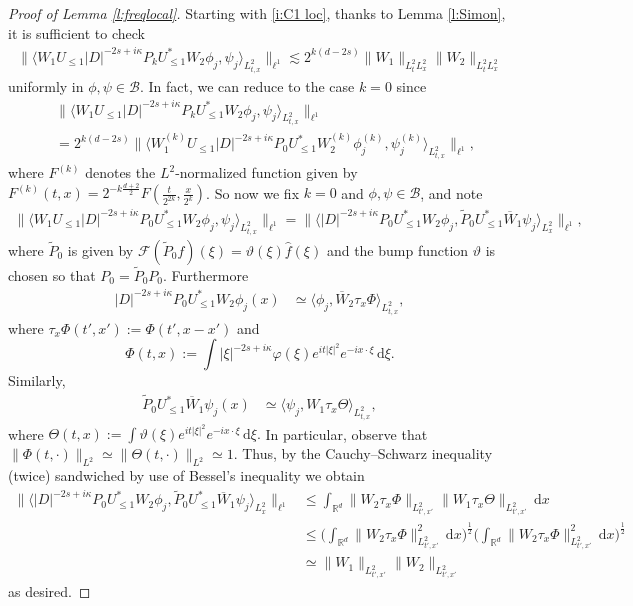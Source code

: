 \documentclass[a4paper]{amsart}
\numberwithin{equation}{section}%
\theoremstyle{plain}%
\theoremstyle{definition}
\theoremstyle{remark}%
\def\d{\mathrm{d}}
\begin{document}
\begin{proof}[Proof of Lemma \ref{l:freqlocal}]
Starting with \eqref{i:C1 loc}, thanks to Lemma \ref{l:Simon}, it is sufficient to check
\begin{align*}
\|\langle W_1U_{\leq 1}|D|^{-2s+i\kappa}P_kU_{\leq 1}^*W_2 \phi_j, \psi_j \rangle_{L^2_{t,x}} \|_{\ell^1}
\lesssim
    2^{k(d-2s)}
    \|W_1\|_{L_t^{2}L_x^2}\|W_2\|_{L_t^{2}L_x^2}
\end{align*}
uniformly in $\phi,\psi \in \mathcal{B}$. In fact, we can reduce to the case $k=0$ since
\begin{align*}
& \|\langle W_1U_{\leq 1}|D|^{-2s+i\kappa}P_kU_{\leq 1}^*W_2 \phi_j, \psi_j \rangle_{L^2_{t,x}} \|_{\ell^1} \\
& = 2^{k(d-2s)} \|\langle W_1^{(k)}U_{\leq 1}|D|^{-2s+i\kappa}P_0U_{\leq 1}^*W_2^{(k)} \phi_j^{(k)}, \psi_j^{(k)} \rangle_{L^2_{t,x}} \|_{\ell^1},
\end{align*}
where $F^{(k)}$ denotes the $L^2$-normalized function given by $F^{(k)}(t,x) = 2^{-k\frac{d+2}{2}} F(\frac{t}{2^{2k}},\frac{x}{2^k})$. So now we fix $k = 0$ and $\phi,\psi \in \mathcal{B}$, and note 
\begin{align*}
\|\langle W_1U_{\leq 1}|D|^{-2s+i\kappa}P_0U_{\leq 1}^*W_2 \phi_j, \psi_j \rangle_{L^2_{t,x}} \|_{\ell^1}
=
\|\langle |D|^{-2s+i\kappa}P_0U_{\leq 1}^*W_2\phi_j,\widetilde{P}_0U_{\leq 1}^*\overline{W}_1\psi_j\rangle_{L_x^2}\|_{\ell^1},
\end{align*}
where $\widetilde{P}_0$ is given by $\mathcal{F}(\widetilde{P}_0f)(\xi) = \vartheta(\xi)\widehat{f}(\xi)$ and the bump function $\vartheta$ is chosen so that $P_0 = \widetilde{P}_0 P_0$. Furthermore
\begin{align*}
|D|^{-2s+i\kappa}P_0U_{\leq 1}^* W_2\phi_j(x) 
& \simeq \langle \phi_j, \overline{W}_2 \tau_x \Phi \rangle_{L^2_{t,x}},
\end{align*}
where $\tau_x \Phi(t',x') := \Phi(t',x-x')$ and 
\[
\Phi(t,x) := \int |\xi|^{-2s + i\kappa} \varphi(\xi)e^{it|\xi|^2} e^{-ix\cdot \xi}  \,\mathrm{d}\xi. 
\]
Similarly, 
\begin{align*}
\widetilde{P}_0U_{\leq 1}^* \overline{W}_1\psi_j(x) & \simeq \langle \psi_j, W_1 \tau_x \Theta \rangle_{L^2_{t,x}},
\end{align*}
where $\Theta(t,x) := \int  \vartheta(\xi)e^{it|\xi|^2} e^{-ix\cdot \xi}  \,\mathrm{d}\xi.
$
In particular, observe that $\|\Phi(t,\cdot)\|_{L^2} \simeq \|\Theta(t,\cdot)\|_{L^2} \simeq 1$. Thus, by the Cauchy--Schwarz inequality (twice) sandwiched by use of Bessel's inequality we obtain
\begin{align*}
\|\langle |D|^{-2s+i\kappa}P_0U_{\leq 1}^*W_2\phi_j,\widetilde{P}_0U_{\leq 1}^*\overline{W}_1\psi_j\rangle_{L_x^2}\|_{\ell^1} &\leq
\int_{\mathbb R^d}
\| W_2 \tau_x\Phi \|_{L^2_{t',x'}}
\| W_1 \tau_x\Theta \|_{L^2_{t',x'}}
\,\d x \\
& \leq 
\bigg(\int_{\mathbb R^d}
\| W_2 \tau_x\Phi \|_{L^2_{t',x'}}^2 \,\d x \bigg)^{\frac{1}{2}}
\bigg(\int_{\mathbb R^d}
\| W_2 \tau_x\Phi \|_{L^2_{t',x'}}^2 \,\d x \bigg)^{\frac{1}{2}} \\
& \simeq \|W_1\|_{L^2_{t',x'}}\|W_2\|_{L^2_{t',x'}}
\end{align*}
as desired.


\end{proof}
\end{document}
